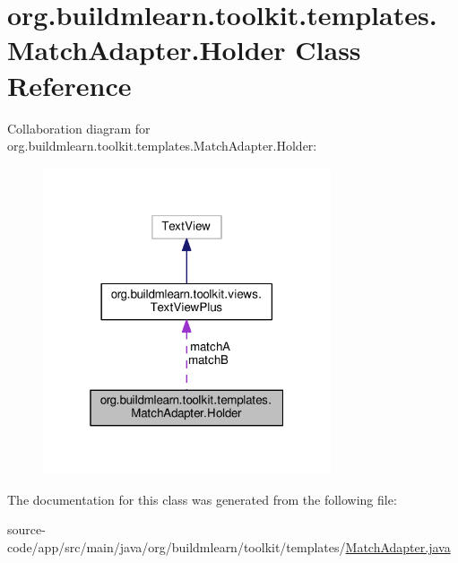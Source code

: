 \hypertarget{classorg_1_1buildmlearn_1_1toolkit_1_1templates_1_1MatchAdapter_1_1Holder}{}\section{org.\+buildmlearn.\+toolkit.\+templates.\+Match\+Adapter.\+Holder Class Reference}
\label{classorg_1_1buildmlearn_1_1toolkit_1_1templates_1_1MatchAdapter_1_1Holder}


Collaboration diagram for org.\+buildmlearn.\+toolkit.\+templates.\+Match\+Adapter.\+Holder\+:
\nopagebreak
\begin{figure}[H]
\begin{center}
\leavevmode
\includegraphics[width=241pt]{classorg_1_1buildmlearn_1_1toolkit_1_1templates_1_1MatchAdapter_1_1Holder__coll__graph}
\end{center}
\end{figure}


The documentation for this class was generated from the following file\+:\begin{DoxyCompactItemize}
\item 
source-\/code/app/src/main/java/org/buildmlearn/toolkit/templates/\hyperlink{MatchAdapter_8java}{Match\+Adapter.\+java}\end{DoxyCompactItemize}

